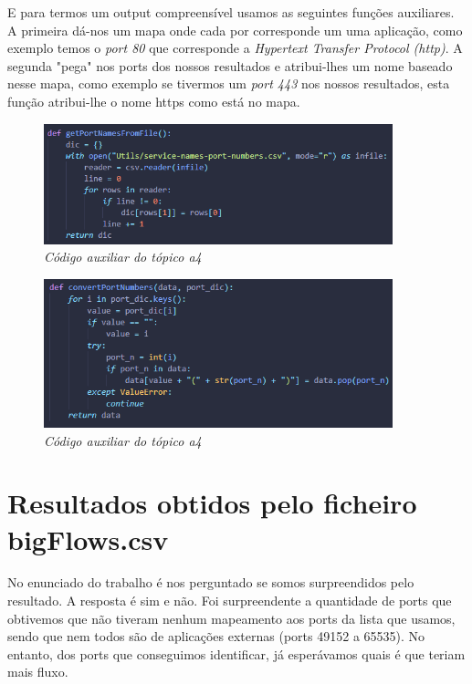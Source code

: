 E para termos um output compreensível usamos as seguintes funções auxiliares. A primeira dá-nos um mapa onde cada por corresponde um uma aplicação, como exemplo temos o \textit{port 80} que corresponde a \textit{Hypertext Transfer Protocol (http)}. A segunda "pega" nos ports dos nossos resultados e atribui-lhes um nome baseado nesse mapa, como exemplo se tivermos um \textit{port 443} nos nossos resultados, esta função atribui-lhe o nome https como está no mapa.

\begin{figure}[h!]
    \label{high}
    \centering
    \includegraphics[width=0.9\textwidth]{Images/a4/getPortNamesFromFile.png}
    \caption{\textit{Código auxiliar do tópico a4}}
\end{figure}

\begin{figure}[h!]
    \label{high}
    \centering
    \includegraphics[width=0.9\textwidth]{Images/a4/convertPortNumbers.png}
    \caption{\textit{Código auxiliar do tópico a4}}
\end{figure}

\newpage


\section{Resultados obtidos pelo ficheiro bigFlows.csv}

No enunciado do trabalho é nos perguntado se somos surpreendidos pelo resultado. A resposta é sim e não. Foi surpreendente a quantidade de ports que obtivemos que não tiveram nenhum mapeamento aos ports da lista que usamos, sendo que nem todos são de aplicações externas (ports 49152 a 65535). No entanto, dos ports que conseguimos identificar, já esperávamos quais é que teriam mais fluxo.

